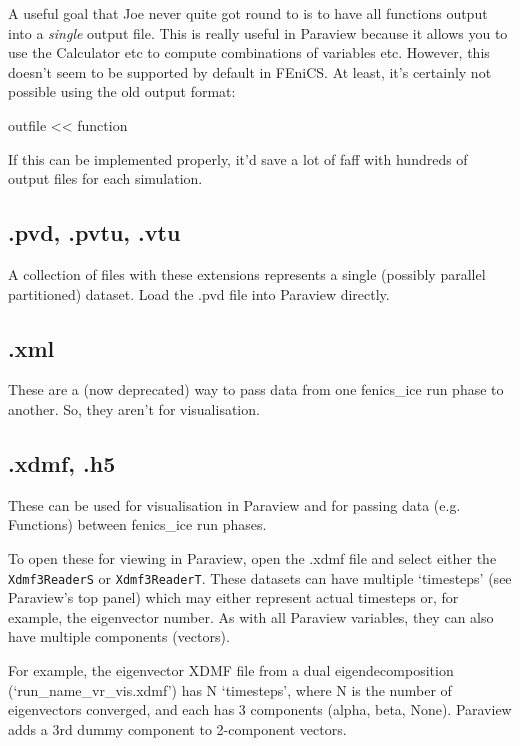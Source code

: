 \documentclass[11pt, reqno, nocenter]{article}
\begin{document}
A useful goal that Joe never quite got round to is to have all functions output into a \emph{single} output file. This is really useful in Paraview because it allows you to use the Calculator etc to compute combinations of variables etc. However, this doesn't seem to be supported by default in FEniCS. At least, it's certainly not possible using the old output format:

\begin{spverbatim}
outfile << function
\end{spverbatim}

If this can be implemented properly, it'd save a lot of faff with hundreds of output files for each simulation.

\subsection{.pvd, .pvtu, .vtu}

A collection of files with these extensions represents a single (possibly parallel partitioned) dataset. Load the .pvd file into Paraview directly.

\subsection{.xml}

These are a (now deprecated) way to pass data from one fenics\_ice run phase to another. So, they aren't for visualisation.

\subsection{.xdmf, .h5}

These can be used for visualisation in Paraview and for passing data (e.g. Functions) between fenics\_ice run phases.

To open these for viewing in Paraview, open the .xdmf file and select either the \texttt{Xdmf3ReaderS} or \texttt{Xdmf3ReaderT}. These datasets can have multiple `timesteps' (see Paraview's top panel) which may either represent actual timesteps or, for example, the eigenvector number. As with all Paraview variables, they can also have multiple components (vectors).

For example, the eigenvector XDMF file from a dual eigendecomposition (`run\_name\_vr\_vis.xdmf') has N `timesteps', where N is the number of eigenvectors converged, and each has 3 components (alpha, beta, None). Paraview adds a 3rd dummy component to 2-component vectors.
\end{document}
